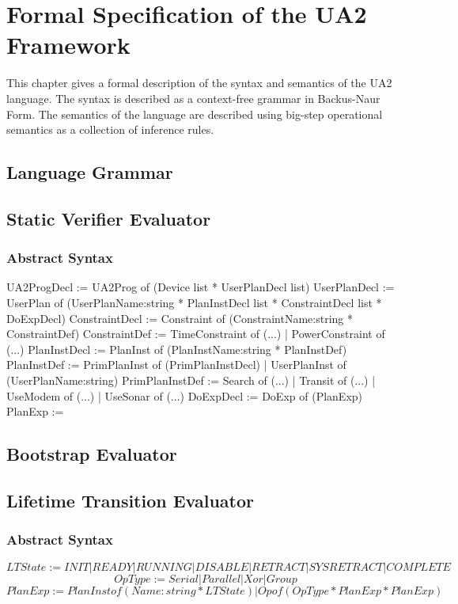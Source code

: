 

\chapter{Formal Specification of the UA2 Framework}
This chapter gives a formal description of the syntax and semantics of the UA2 language. The syntax is described as a context-free grammar in Backus-Naur Form. The semantics of the language are described using big-step operational semantics as a collection of inference rules.

\section{Language Grammar}

\section{Static Verifier Evaluator}
\subsection{Abstract Syntax}
UA2ProgDecl     := UA2Prog of (Device list * UserPlanDecl list)
UserPlanDecl    := UserPlan of (UserPlanName:string * PlanInstDecl list * ConstraintDecl list * DoExpDecl)
ConstraintDecl  := Constraint of (ConstraintName:string * ConstraintDef)
ConstraintDef   := TimeConstraint of (...) | PowerConstraint of (...)
PlanInstDecl    := PlanInst of (PlanInstName:string * PlanInstDef)
PlanInstDef     := PrimPlanInst of (PrimPlanInstDecl) | UserPlanInst of (UserPlanName:string)
PrimPlanInstDef := Search of (...) | Transit of (...) | UseModem of (...) | UseSonar of (...)
DoExpDecl       := DoExp of (PlanExp)
PlanExp         := 



\section{Bootstrap Evaluator}

\section{Lifetime Transition Evaluator}

\subsection{Abstract Syntax}

$$LTState := INIT | READY | RUNNING | DISABLE | RETRACT | SYSRETRACT | COMPLETE$$
$$OpType := Serial | Parallel | Xor | Group$$
$$PlanExp := PlanInst of (Name:string * LTState) | Op of (OpType * PlanExp * PlanExp)$$


